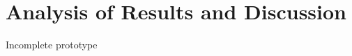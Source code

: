 
\chapter{Analysis of Results and Discussion}
\begin{spacing}{2.0}

Incomplete prototype


\end{spacing}
\newpage
